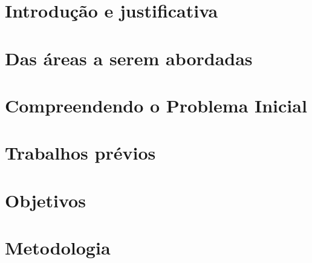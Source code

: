\documentclass[12pt,a4paper]{article}
\makeatletter
\renewcommand\tableofcontents{%
    \section*{\huge\centering\contentsname
        \@mkboth{%
           \MakeUppercase\contentsname}{\MakeUppercase\contentsname}}%
           \vspace{24pt}%
    \@starttoc{toc}%
    \newpage%
}
\makeatother
\begin{document}
\noindent{}
\newpage
\pagestyle{empty} %
\tableofcontents
\newpage
\setcounter{page}{1}
\pagestyle{plain} %

\section{Introdução e justificativa}
\label{section:introduction}


\section{Das áreas a serem abordadas}
\label{section:rl_mm}


\section{Compreendendo o Problema Inicial}
\label{section:problem_description}


\section{Trabalhos prévios}
\label{section:previous_works}


\section{Objetivos}
\label{section:objectives}


\section{Metodologia}
\label{section:methodology}


\newpage



\end{document}
